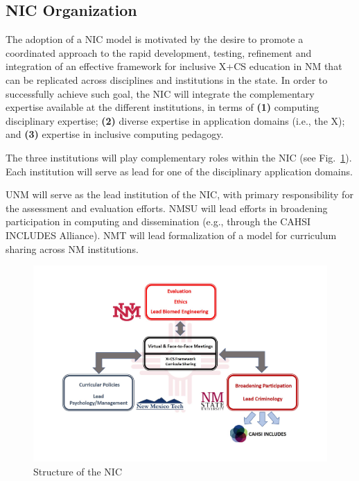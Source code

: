 \subsection{NIC Organization}
 
The adoption of a NIC model is motivated by the desire to promote a coordinated approach to the rapid development, testing, refinement and integration of an effective framework for inclusive X+CS education in NM that can be replicated across disciplines and institutions in the state. In order to successfully achieve such goal, the NIC will integrate the complementary expertise available at the different institutions, in terms of 
{\bf (1)} computing disciplinary expertise; {\bf (2)} diverse expertise in application domains (i.e., the X); and 
{\bf (3)} expertise in inclusive computing pedagogy. 

The three institutions will play complementary roles within the NIC (see Fig.~\ref{nic}). Each institution will serve as lead for one of the disciplinary application domains.

UNM will serve as the lead institution of the NIC, with primary responsibility for the assessment and evaluation efforts.
NMSU will lead efforts in broadening participation in computing and dissemination (e.g., through the CAHSI INCLUDES Alliance).
NMT will lead formalization of a model for curriculum sharing across NM institutions. 


\begin{figure}[htbp]
\centerline{\includegraphics[width=.8\textwidth]{nic.pdf}}
\caption{Structure of the NIC}
\label{nic}
\end{figure}

